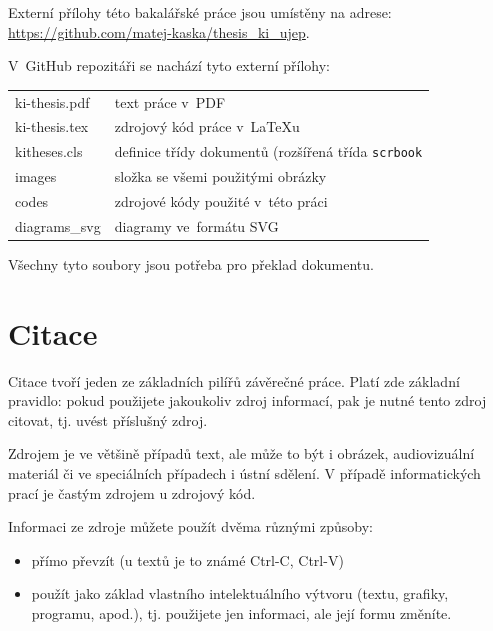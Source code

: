 \documentclass[male,czech,api_bc]{kitheses}
\begin{document}
Externí přílohy této bakalářské práce jsou umístěny na adrese:\\ \url{https://github.com/matej-kaska/thesis_ki_ujep}.

V~GitHub repozitáři se nachází tyto externí přílohy:

\begin{longtable}{ll}
	\hline
	ki-thesis.pdf & text práce v~PDF \\
	ki-thesis.tex & zdrojový kód práce v~\LaTeX{}u \\
	kitheses.cls & definice třídy dokumentů (rozšířená třída \texttt{scrbook} \\
	images & složka se všemi použitými obrázky \\
	codes & zdrojové kódy použité v~této práci \\
	diagrams\_svg & diagramy ve~formátu SVG \\
	\hline
\end{longtable}

Všechny tyto soubory jsou potřeba pro překlad dokumentu.























\chapter{Citace}

Citace tvoří jeden ze základních pilířů závěrečné práce. Platí zde základní pravidlo: pokud použijete 
jakoukoliv zdroj informací, pak je nutné tento zdroj citovat, tj. uvést příslušný zdroj.

Zdrojem je ve většině případů text, ale může to být i obrázek, audiovizuální materiál či ve speciálních případech i ústní sdělení. V případě informatických prací je častým zdrojem u zdrojový kód.

Informaci ze zdroje můžete použít dvěma různými způsoby:

\begin{itemize}
\item přímo převzít (u textů je to známé Ctrl-C, Ctrl-V)
\item použít jako základ vlastního intelektuálního výtvoru (textu, grafiky, programu, apod.), tj. použijete jen informaci, ale její formu změníte.
\end{itemize}
\end{document}
